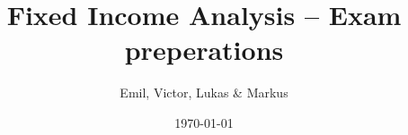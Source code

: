 \documentclass[a4paper,oneside,article,english]{memoir}
\title{Fixed Income Analysis -- Exam preperations}
\author{Emil, Victor, Lukas \& Markus}
\date{\today}
\begin{document}
\maketitle

\tableofcontents
\listoffixmes














\end{document}
